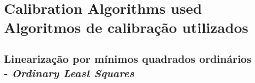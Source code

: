 

\chapter[\lang{Algorithms Presentation}{Algoritmos de calibração utilizados}]
{
    \lang
    {Calibration Algorithms used}
    {Algoritmos de calibração utilizados}
}

\label{cap_algoritmos}





\section{Linearização por mínimos quadrados ordinários - \textit{Ordinary Least Squares}}

